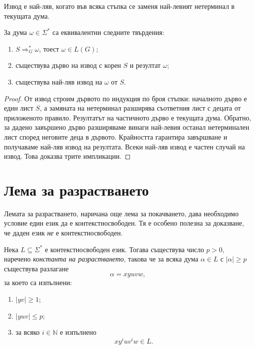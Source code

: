 \begin{defn}
Извод е най-ляв, когато във всяка стъпка се заменя най-левият нетерминал в текущата дума.
\end{defn}

\begin{prop} За дума $\omega\in\Sigma^*$ са еквивалентни следните твърдения:

\begin{enumerate}
\item $S\Rightarrow_G^*\omega$, тоест $\omega\in L(G)$;
\item съществува дърво на извод с корен $S$ и резултат $\omega$;
\item съществува най-ляв извод на $\omega$ от $S$.
\end{enumerate}

\end{prop}
\begin{proof}
От извод строим дървото по индукция по броя стъпки: началното дърво е един лист $S$, а замяната на нетерминал разширява съответния лист с децата от приложеното правило. Резултатът на частичното дърво е текущата дума. Обратно, за дадено завършено дърво разширяваме винаги най-левия останал нетерминален лист според неговите деца в дървото. Крайността гарантира завършване и получаваме най-ляв извод на резултата. Всеки най-ляв извод е частен случай на извод. Това доказва трите импликации.
\end{proof}

\section{Лема за разрастването}\label{s:5.2}

Лемата за разрастването, наричана още лема за покачването, дава необходимо условие един език да е контекстносвободен. Тя е особено полезна за доказване, че даден език \emph{не} е контекстносвободен.

\begin{keythm}
Нека $L\subseteq\Sigma^*$ е контекстносвободен език. Тогава съществува число $p>0$, наречено \emph{константа на разрастването}, такова че за всяка дума $\alpha\in L$ с $|\alpha|\geq p$ съществува разлагане
\[
\alpha=xyuvw,
\]
за което са изпълнени:

\begin{enumerate}
\item $|yv|\geq 1$;
\item $|yuv|\leq p$;
\item за всяко $i\in\mathbb{N}$ е изпълнено
\[
xy^iuv^iw\in L.
\]
\end{enumerate}
\end{keythm}

